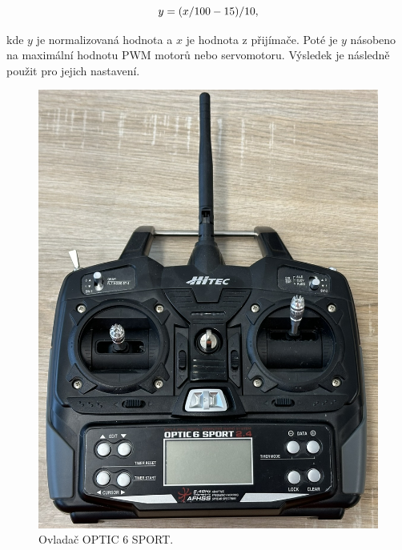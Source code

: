 \begin{equation}
	\centering
	y = (x / 100 - 15) / 10,
\end{equation}

kde $y$ je normalizovaná hodnota a $x$ je hodnota z přijímače. Poté je $y$ násobeno na maximální hodnotu PWM motorů nebo servomotoru. Výsledek je následně použit pro jejich nastavení.

\begin{figure}[!h]
    \centering
    \includegraphics[width = 0.5\linewidth]{Figures/Joystick.png}
    \caption{Ovladač OPTIC 6 SPORT.}
    \label{fig:Joystick}
\end{figure}

\endinput
